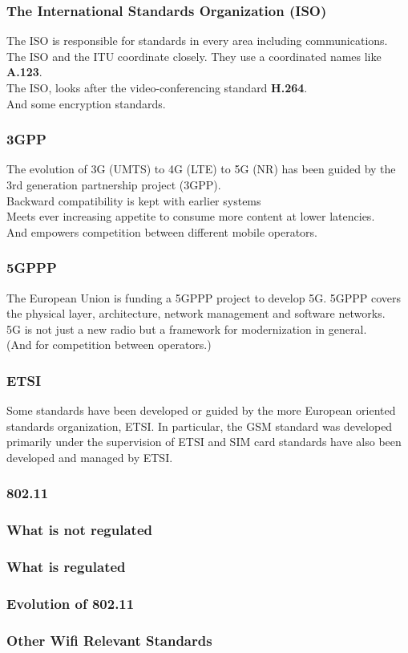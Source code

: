 \documentclass[18pt]{beamer}
\begin{document}
\begin{frame}\LARGE
\frametitle{The International Standards Organization (ISO)}
\large
The ISO is responsible for standards in every area
including communications.\\[4mm] 
The ISO and the ITU coordinate closely.
They use a coordinated names like {\bf A.123}.\\[4mm]
%
The ISO, looks after the video-conferencing standard {\bf H.264}.\\[4mm]
And some encryption standards.
\end{frame}

\begin{frame}\LARGE
\frametitle{3GPP}
\Large
The evolution of 3G (UMTS) to 4G (LTE) to 5G (NR) 
has been guided by the 3rd generation partnership project (3GPP).\\[3mm]
Backward compatibility is kept with earlier systems\\[3mm]
%
Meets ever increasing appetite to consume more content at lower latencies.  \\[3mm]
And empowers competition between different mobile operators.
\end{frame}

\begin{frame}\LARGE
\frametitle{5GPPP}
The European Union is funding a 5GPPP project
to develop 5G. 5GPPP covers the physical layer,
architecture, network management and software networks.\\[3mm]
%
5G is not just a new radio but a framework 
for modernization in general.\\[3mm]
%
(And for competition between operators.)
\end{frame}

\begin{frame}\LARGE
\frametitle{ETSI}
Some standards have been developed or guided by the more European
oriented standards organization, ETSI. In particular, the GSM \cite{GSM}
standard was developed primarily under the supervision of ETSI and
SIM card standards have also been developed and managed by ETSI.
\end{frame}

\begin{frame}\LARGE
\frametitle{802.11}
\end{frame}

\begin{frame}\LARGE
\frametitle{What is not regulated}
\end{frame}

\begin{frame}\LARGE
\frametitle{What is regulated}
\end{frame}

\begin{frame}\LARGE
\frametitle{Evolution of 802.11}
\end{frame}

\begin{frame}\LARGE
\frametitle{Other Wifi Relevant Standards}
%


\end{frame}
\end{document}
